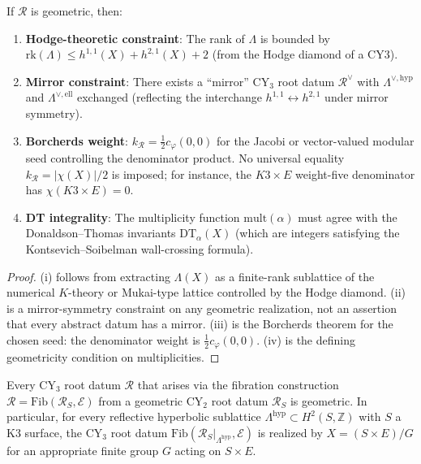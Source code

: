 \begin{proposition}
\label{prop:necessary-geometric}

If $\mathcal{R}$ is geometric, then:
\begin{enumerate}[label=(\roman*)]
 \item \textbf{Hodge-theoretic constraint}: The rank of $\Lambda$ is bounded by $\mathrm{rk}(\Lambda) \leq h^{1,1}(X) + h^{2,1}(X) + 2$ (from the Hodge diamond of a CY3).
 \item \textbf{Mirror constraint}: There exists a ``mirror'' CY$_3$ root datum $\mathcal{R}^\vee$ with $\Lambda^{\vee, \mathrm{hyp}}$ and $\Lambda^{\vee, \mathrm{ell}}$ exchanged (reflecting the interchange $h^{1,1} \leftrightarrow h^{2,1}$ under mirror symmetry).
 \item \textbf{Borcherds weight}: $k_\mathcal{R} =
 \frac{1}{2}c_\varphi(0,0)$ for the Jacobi or vector-valued modular
 seed controlling the denominator product. No universal equality
 $k_\mathcal{R}=|\chi(X)|/2$ is imposed; for instance, the
 $K3\times E$ weight-five denominator has $\chi(K3\times E)=0$.
 \item \textbf{DT integrality}: The multiplicity function $\mathrm{mult}(\alpha)$ must agree with the Donaldson--Thomas invariants $\mathrm{DT}_\alpha(X)$ (which are integers satisfying the Kontsevich--Soibelman wall-crossing formula).
\end{enumerate}
\end{proposition}

\begin{proof}
(i) follows from extracting $\Lambda(X)$ as a finite-rank sublattice of
the numerical $K$-theory or Mukai-type lattice controlled by the Hodge
diamond. (ii) is a mirror-symmetry constraint on any geometric
realization, not an assertion that every abstract datum has a mirror.
(iii) is the Borcherds theorem for the chosen seed: the denominator
weight is $\frac12 c_\varphi(0,0)$. (iv) is the defining
geometricity condition on multiplicities.
\end{proof}

\begin{conjecture}
\label{conj:fibered-geometric}

Every CY$_3$ root datum $\mathcal{R}$ that arises via the fibration construction $\mathcal{R} = \mathrm{Fib}(\mathcal{R}_S, \mathcal{E})$ from a geometric CY$_2$ root datum $\mathcal{R}_S$ is geometric. In particular, for every reflective hyperbolic sublattice $\Lambda^{\mathrm{hyp}} \subset H^2(S, \mathbb{Z})$ with $S$ a K3 surface, the CY$_3$ root datum $\mathrm{Fib}(\mathcal{R}_S|_{\Lambda^{\mathrm{hyp}}}, \mathcal{E})$ is realized by $X = (S \times E)/G$ for an appropriate finite group $G$ acting on $S \times E$.
\end{conjecture}

